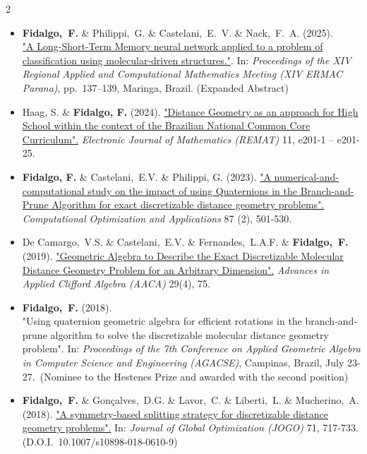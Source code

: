 \documentclass[10pt,A4,english]{article}
\begin{document}
\begin{paracol}{2}
\begin{rightcolumn}
\begin{itemize}[leftmargin=*]
\item \textbf{Fidalgo,~F.} \& Philippi,~G. \& Castelani,~E.~V. 
\& Nack,~F.~A. (2025). \\ 
\href{https://drive.google.com/file/d/1XyeFNhor3UIy8hiweu895VoyY0SOQMnC/view}
{"A Long-Short-Term Memory neural network applied to a problem 
of classification using molecular-driven structures."}. 
In: \textit{Proceedings of the XIV Regional Applied and Computational 
Mathematics Meeting (XIV ERMAC Parana)}, pp.~137--139, Maringa, Brazil. 
(Expanded Abstract)
%
\\[5pt]
%
\item Haag, S. \& \textbf{Fidalgo, F.} (2024).
\href{ https://doi.org/10.35819/remat2025v11id7227 }{"Distance Geometry as an approach for High School within the context of the Brazilian National Common Core Curriculum".} 
\textit{Electronic Journal of Mathematics (REMAT)} 11, e201-1 -- e201-25.
%
\\[5pt]
%
\item \textbf{Fidalgo, F.} \& Castelani,~E.V. \& Philippi, G. (2023). \href{https://doi.org/10.1007/s10589-023-00526-8}{"A numerical-and-computational study on the impact of using Quaternions in the Branch-and-Prune Algorithm for exact discretizable distance geometry problems".} \textit{Computational Optimization and Applications} 87 (2), 501-530.
%
\\[5pt]
%
\item De Camargo,~V.S. \& Castelani,~E.V. \&  Fernandes,~L.A.F. \& \textbf{Fidalgo,~F.} (2019). \href{https://doi.org/10.1007/s00006-019-0995-7}{"Geometric Algebra to Describe the Exact Discretizable Molecular Distance Geometry Problem for an Arbitrary Dimension".} \textit{Advances in Applied Clifford Algebra (AACA)} 29(4), 75. 
%
\\[5pt]
%
\item \textbf{Fidalgo,~F.} (2018). \\ "Using quaternion geometric algebra for efficient rotations in the branch‐and‐prune algorithm   to solve the discretizable molecular distance geometry problem". In: \textit{Proceedings of the 7th Conference on Applied Geometric Algebra in Computer Science and Engineering (AGACSE)}, Campinas, Brazil, July 23-27.~(Nominee to the Hestenes Prize and awarded with the second position)
%
\\[5pt]
%
\item \textbf{Fidalgo,~F.} \& Gonçalves,~D.G. \& Lavor,~C. \& Liberti,~L. \& Mucherino,~A. (2018). \href{https://doi.org/10.1007/s10898-018-0610-9}{"A symmetry-based splitting strategy for discretizable distance geometry problems".} In: \textit{Journal of Global Optimization (JOGO)} 71, 717-733. (D.O.I.~10.1007/s10898-018-0610-9)

\end{itemize}
\end{rightcolumn}
\end{paracol}
\end{document}
